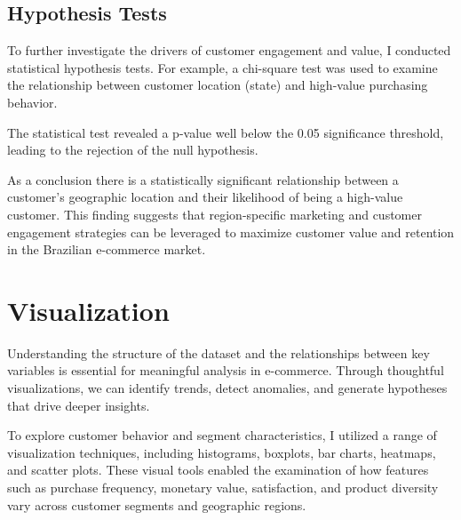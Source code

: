 \documentclass[a4paper]{article}
\begin{document}
\begin{multicols}{2}
\subsection{Hypothesis Tests}
To further investigate the drivers of customer engagement and value, I conducted statistical hypothesis tests. For example, a chi-square test was used to examine the relationship between customer location (state) and high-value purchasing behavior.

The statistical test revealed a p-value well below the 0.05 significance threshold, leading to the rejection of the null hypothesis.

As a conclusion there is a statistically significant relationship between a customer's geographic location and their likelihood of being a high-value customer. This finding suggests that region-specific marketing and customer engagement strategies can be leveraged to maximize customer value and retention in the Brazilian e-commerce market.





\section{Visualization}

Understanding the structure of the dataset and the relationships between key variables is essential for meaningful analysis in e-commerce. Through thoughtful visualizations, we can identify trends, detect anomalies, and generate hypotheses that drive deeper insights.

To explore customer behavior and segment characteristics, I utilized a range of visualization techniques, including histograms, boxplots, bar charts, heatmaps, and scatter plots. These visual tools enabled the examination of how features such as purchase frequency, monetary value, satisfaction, and product diversity vary across customer segments and geographic regions.


\end{multicols}
\end{document}
